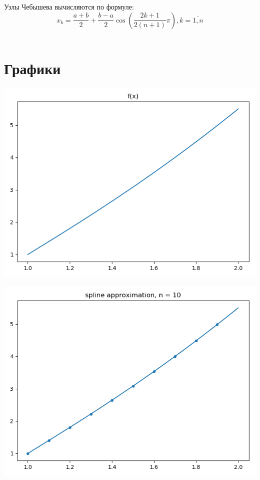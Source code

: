 \documentclass{article}
\begin{document}
Узлы Чебышева вычисляются по формуле:
\begin{equation}
\label{eq:node}
x_k = \dfrac{a+b}{2} + \dfrac{b-a}{2} \cos{\left(\dfrac{2k+1}{2(n+1)} \pi\right)}, k = \overline{1, n} 
\end{equation} \\

\section{Графики}

\includegraphics[scale=0.5]{f(x).png}

\includegraphics[scale=0.5]{10.png}
\end{document}
